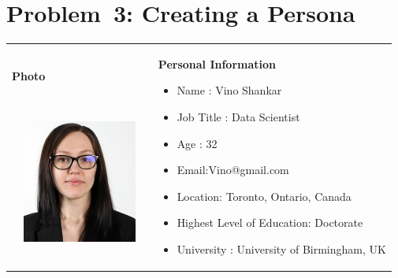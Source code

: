 \documentclass[12pt]{article}
\begin{document}
\vspace{\baselineskip}
\section*{Problem\ 3:  Creating a Persona}

\vspace{\baselineskip}
\vspace{\baselineskip}
\vspace{\baselineskip}
\vspace{\baselineskip}




\begin{table}[H]
 			\centering
\begin{tabular}{p{1.79in}p{3.9in}}
\hline
\multicolumn{1}{|p{1.79in}}{{\fontsize{10pt}{12.0pt}\selectfont \textbf{Photo}} \par {\fontsize{10pt}{12.0pt}\selectfont \textbf{\ \ \ \ \   }} \par 
	\begin{Center}
		\includegraphics[width=1.79in,height=1.59in]{./media/image1.png}
	\end{Center}
} & 
\multicolumn{1}{|p{3.9in}|}{{\fontsize{10pt}{12.0pt}\selectfont \textbf{Personal Information}} \par \begin{itemize}
	\item {\fontsize{10pt}{12.0pt}\selectfont Name : Vino Shankar} \par 	\item {\fontsize{10pt}{12.0pt}\selectfont Job Title : Data Scientist} \par 	\item {\fontsize{10pt}{12.0pt}\selectfont Age : 32} \par 	\item {\fontsize{10pt}{12.0pt}\selectfont Email:Vino@gmail.com} \par 	\item {\fontsize{10pt}{12.0pt}\selectfont Location: Toronto, Ontario, Canada} \par 	\item {\fontsize{10pt}{12.0pt}\selectfont Highest Level of Education: Doctorate} \par 	\item {\fontsize{10pt}{12.0pt}\selectfont University : University of Birmingham, UK} \par 

\end{itemize}}
\end{tabular}
\end{table}
\end{document}

